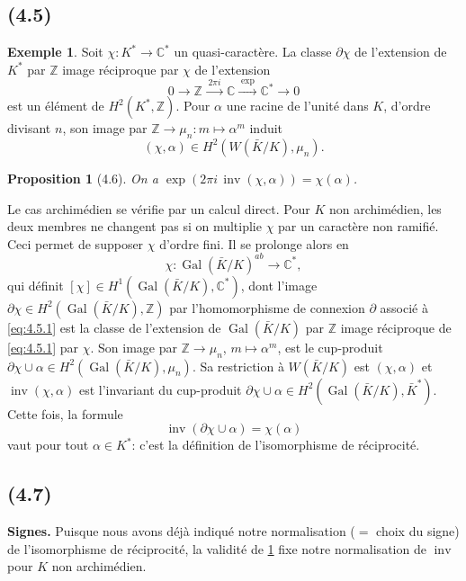 \documentclass[11pt]{amsart}
\theoremstyle{plain}
\newtheorem{proposition}[theoreme]{Proposition}
\theoremstyle{definition}
\newtheorem{exemple}[theoreme]{Exemple}
\DeclareMathOperator{\Gal}{Gal}
\DeclareMathOperator{\inv}{inv}
\newcommand{\C}{\mathbb{C}}
\newcommand{\Z}{\mathbb{Z}}
\begin{document}
\subsection{(4.5)}
\begin{exemple}
Soit $\chi\colon K^*\to\C^*$ un quasi-caract\`ere. La classe $\partial\chi$ de l'extension de $K^*$ par $\Z$ image r\'eciproque par $\chi$ de l'extension
\begin{equation}\label{eq:4.5.1}
0\longrightarrow\Z\xrightarrow{\;2\pi i\;}\C\xrightarrow{\;\exp\;}\C^*\longrightarrow 0
\end{equation}
est un \'el\'ement de $H^2(K^*,\Z)$. Pour $\alpha$ une racine de l'unit\'e dans $K$, d'ordre divisant $n$, son image par $\Z\to\mu_n\colon m\mapsto\alpha^m$ induit
\[
(\chi,\alpha)\in H^2(W(\bar K/K),\mu_n).
\]
\end{exemple}

\begin{proposition}[4.6]\label{prop:4.6}
On a $\exp(2\pi i\,\inv(\chi,\alpha))=\chi(\alpha)$.
\end{proposition}

Le cas archim\'edien se v\'erifie par un calcul direct. Pour $K$ non archim\'edien, les deux membres ne changent pas si on multiplie $\chi$ par un caract\`ere non ramifi\'e. Ceci permet de supposer $\chi$ d'ordre fini. Il se prolonge alors en
\[
\chi\colon\Gal(\bar K/K)^{ab}\longrightarrow\C^*,
\]
qui d\'efinit $[\chi]\in H^1(\Gal(\bar K/K),\C^*)$, dont l'image $\partial\chi\in H^2(\Gal(\bar K/K),\Z)$ par l'homomorphisme de connexion $\partial$ associ\'e \`a \eqref{eq:4.5.1} est la classe de l'extension de $\Gal(\bar K/K)$ par $\Z$ image r\'eciproque de \eqref{eq:4.5.1} par $\chi$. Son image par $\Z\to\mu_n$, $m\mapsto\alpha^m$, est le cup-produit $\partial\chi\cup\alpha\in H^2(\Gal(\bar K/K),\mu_n)$. Sa restriction \`a $W(\bar K/K)$ est $(\chi,\alpha)$ et $\inv(\chi,\alpha)$ est l'invariant du cup-produit $\partial\chi\cup\alpha\in H^2(\Gal(\bar K/K),\bar K^*)$. Cette fois, la formule
\[
\inv(\partial\chi\cup\alpha)=\chi(\alpha)
\]
vaut pour tout $\alpha\in K^*$: c'est la d\'efinition de l'isomorphisme de r\'eciprocit\'e.

\subsection{(4.7)}
\textbf{Signes.} Puisque nous avons d\'ej\`a indiqu\'e notre normalisation ($=$ choix du signe) de l'isomorphisme de r\'eciprocit\'e, la validit\'e de \ref{prop:4.6} fixe notre normalisation de $\inv$ pour $K$ non archim\'edien.
\end{document}

